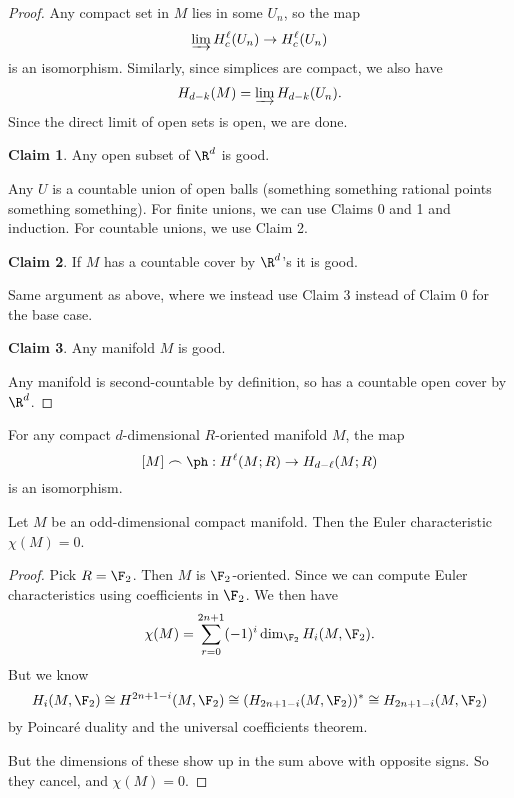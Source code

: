 \documentclass[a4paper]{article}
\theoremstyle{definition}
\newtheorem{cclaim}{Claim}
\begin{document}
\begin{proof}
  Any compact set in $M$ lies in some $U_n$, so the map
  \[
    \varinjlim H_c^\ell (U_n) \to H_c^\ell(U_n)
  \]
  is an isomorphism. Similarly, since simplices are compact, we also have
  \[
    H_{d - k}(M) = \varinjlim H_{d - k}(U_n).
  \]
  Since the direct limit of open sets is open, we are done.

  \begin{cclaim}
    Any open subset of $\R^d$ is good.
  \end{cclaim}
  Any $U$ is a countable union of open balls (something something rational points something something). For finite unions, we can use Claims 0 and 1 and induction. For countable unions, we use Claim 2.

  \begin{cclaim}
    If $M$ has a countable cover by $\R^d$'s it is good.
  \end{cclaim}
  Same argument as above, where we instead use Claim 3 instead of Claim 0 for the base case.

  \begin{cclaim}
    Any manifold $M$ is good.
  \end{cclaim}
  Any manifold is second-countable by definition, so has a countable open cover by $\R^d$.
\end{proof}

\begin{cor}
  For any compact $d$-dimensional $R$-oriented manifold $M$, the map
  \[
    [M] \frown \ph: H^\ell(M; R) \to H_{d - \ell}(M; R)
  \]
  is an isomorphism.
\end{cor}

\begin{cor}
  Let $M$ be an odd-dimensional compact manifold. Then the Euler characteristic $\chi(M) = 0$.
\end{cor}

\begin{proof}
  Pick $R = \F_2$. Then $M$ is $\F_2$-oriented. Since we can compute Euler characteristics using coefficients in $\F_2$. We then have
  \[
    \chi(M) = \sum_{r = 0}^{2n + 1} (-1)^i \dim_{\F_2} H_i(M, \F_2).
  \]
  But we know
  \[
    H_i(M, \F_2) \cong H^{2n + 1 - i}(M, \F_2) \cong (H_{2n + 1 - i}(M, \F_2))^* \cong H_{2n + 1 - i}(M, \F_2)
  \]
  by Poincar\'e duality and the universal coefficients theorem.

  But the dimensions of these show up in the sum above with opposite signs. So they cancel, and $\chi(M) = 0$.
\end{proof}
\end{document}
